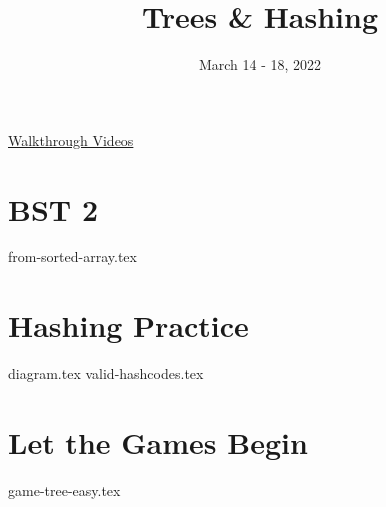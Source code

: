 \documentclass[11pt]{exam}
\title{Trees \& Hashing}
\date{March 14 - 18, 2022}
\begin{document}
\maketitle

\href{https://youtube.com/playlist?list=PLN303KpCz_KTekMA-bNi8DU52FFzeY-oj}{Walkthrough Videos}

\section{BST 2}
\begin{questions}
{from-sorted-array.tex}
\end{questions}
\clearpage


\section{Hashing Practice}
\begin{questions}
{diagram.tex}
\clearpage
{valid-hashcodes.tex}
\end{questions}
\clearpage

\section{Let the Games Begin}
\begin{questions}
{game-tree-easy.tex}
\end{questions}
\clearpage
\end{document}
